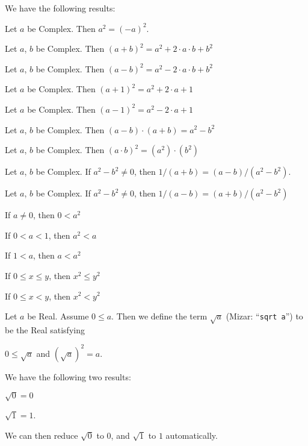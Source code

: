 \documentclass{article}
\begin{document}
We have the following results:
\begin{thm}
\item\label{square1:3} Let $a$ be Complex. Then $a^{2}=(-a)^{2}$.
\item\label{square1:4} Let $a$, $b$ be Complex. Then
  $(a+b)^{2}=a^{2}+2\cdot a\cdot b+b^{2}$
\item\label{square1:5} Let $a$, $b$ be Complex. Then
  $(a-b)^{2}=a^{2}-2\cdot a\cdot b+b^{2}$
\item\label{square1:6} Let $a$ be Complex. Then $(a+1)^{2}=a^{2}+2\cdot a+1$
\item\label{square1:7} Let $a$ be Complex. Then $(a-1)^{2}=a^{2}-2\cdot a+1$
\item\label{square1:8} Let $a$, $b$ be Complex. Then
  $(a-b)\cdot(a+b)=a^{2}-b^{2}$
\item\label{square1:9} Let $a$, $b$ be Complex. Then
  $(a\cdot b)^{2}=(a^{2})\cdot(b^{2})$
\item\label{square1:10} Let $a$, $b$ be Complex. If $a^{2}-b^{2}\neq0$,
  then $1/(a+b)=(a-b)/(a^{2}-b^{2})$.
\item\label{square1:11} Let $a$, $b$ be Complex. If $a^{2}-b^{2}\neq0$,
  then $1/(a-b)=(a+b)/(a^{2}-b^{2})$
\item\label{square1:12} If $a\neq0$, then $0<a^{2}$
\item\label{square1:13} If $0<a<1$, then $a^{2}<a$
\item\label{square1:14} If $1<a$, then $a<a^{2}$
\item\label{square1:15} If $0\leq x\leq y$, then $x^{2}\leq y^{2}$
\item\label{square1:16} If $0\leq x<y$, then $x^{2}<y^{2}$
\end{thm}

\begin{definition}
Let $a$ be Real. Assume $0\leq a$.
Then we define the term $\sqrt{a}$ (Mizar: ``\verb#sqrt a#'') to be the
Real satisfying
\begin{defn}
\item $0\leq\sqrt{a}$ and $(\sqrt{a})^{2}=a$.
\end{defn}
\end{definition}

We have the following two results:
\begin{thm}
\item\label{square1:17} $\sqrt{0}=0$
\item\label{square1:18} $\sqrt{1}=1$.
\end{thm}
We can then reduce $\sqrt{0}$ to $0$, and $\sqrt{1}$ to $1$ automatically.
\end{document}
